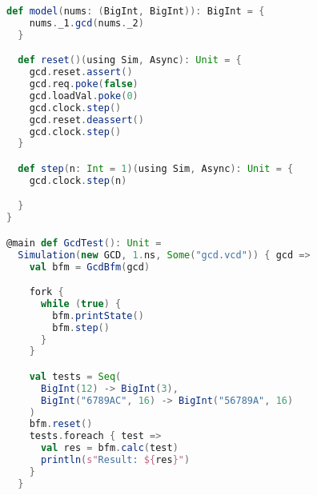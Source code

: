 \begin{lstlisting}[language=scala, captionpos=b, caption=Test code for the GCD circuit.,label=lst:gcd_test]
  def model(nums: (BigInt, BigInt)): BigInt = {
    nums._1.gcd(nums._2)
  }

  def reset()(using Sim, Async): Unit = {
    gcd.reset.assert()
    gcd.req.poke(false)
    gcd.loadVal.poke(0)
    gcd.clock.step()
    gcd.reset.deassert()
    gcd.clock.step()
  }

  def step(n: Int = 1)(using Sim, Async): Unit = {
    gcd.clock.step(n)

  }
}

@main def GcdTest(): Unit =
  Simulation(new GCD, 1.ns, Some("gcd.vcd")) { gcd =>
    val bfm = GcdBfm(gcd)

    fork {
      while (true) {
        bfm.printState()
        bfm.step()
      }
    }

    val tests = Seq(
      BigInt(12) -> BigInt(3),
      BigInt("6789AC", 16) -> BigInt("56789A", 16) 
    )
    bfm.reset()
    tests.foreach { test =>
      val res = bfm.calc(test)
      println(s"Result: ${res}")
    }
  }
\end{lstlisting}

\newpage
